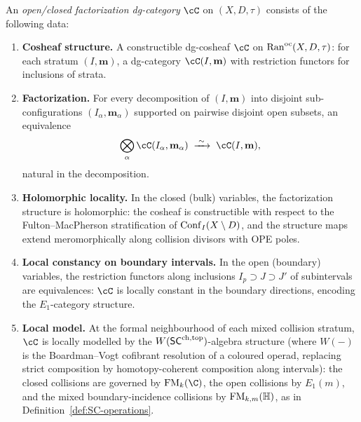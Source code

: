 \begin{definition}
\label{def:oc-factorization-category}
An \emph{open/closed factorization dg-category} $\cC$ on
$(X, D, \tau)$ consists of the following data:
\begin{enumerate}[label=\textup{(\roman*)}]
\item \textbf{Cosheaf structure.} A constructible dg-cosheaf
 $\cC$ on $\mathrm{Ran}^{\mathrm{oc}}(X,D,\tau)$: for each stratum
 $(I,\mathbf{m})$, a dg-category
 $\cC(I,\mathbf{m})$ with restriction functors for inclusions of
 strata.

\item \textbf{Factorization.} For every decomposition of
 $(I,\mathbf{m})$ into disjoint sub-configurations
 $(I_\alpha,\mathbf{m}_\alpha)$ supported on pairwise disjoint
 open subsets, an equivalence
 \[
 \bigotimes_\alpha \cC(I_\alpha,\mathbf{m}_\alpha)
 \;\xrightarrow{\;\sim\;}\;
 \cC(I,\mathbf{m}),
 \]
 natural in the decomposition.

\item \textbf{Holomorphic locality.} In the closed (bulk)
 variables, the factorization structure is holomorphic: the
 cosheaf is constructible with respect to the
 Fulton--MacPherson stratification of $\mathrm{Conf}_I(X \setminus D)$,
 and the structure maps extend meromorphically along collision
 divisors with OPE poles.

\item \textbf{Local constancy on boundary intervals.} In the open
 (boundary) variables, the restriction functors along inclusions
 $I_p \supset J \supset J'$ of subintervals are equivalences:
 $\cC$ is locally constant in the boundary directions, encoding
 the $E_1$-category structure.

\item \textbf{Local model.} At the formal neighbourhood of each
 mixed collision stratum, $\cC$ is locally modelled by the
 $W(\mathsf{SC}^{\mathrm{ch},\mathrm{top}})$-algebra structure (where
 $W(-)$ is the Boardman--Vogt cofibrant resolution of a coloured
 operad, replacing strict composition by homotopy-coherent
 composition along intervals): the closed collisions are governed
 by $\FM_k(\C)$, the open collisions by $E_1(m)$, and the mixed
 boundary-incidence collisions by $\mathrm{FM}_{k,m}(\mathbb H)$, as in
 Definition~\ref{def:SC-operations}.


\end{enumerate}
\end{definition}
